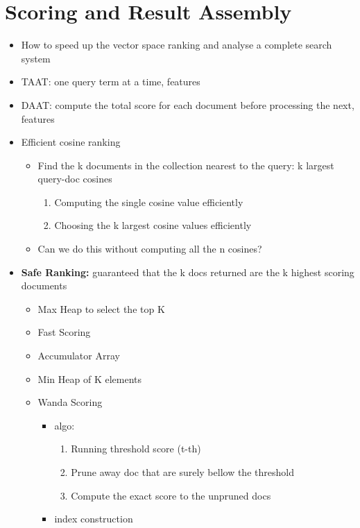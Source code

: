 \chapter{Scoring and Result Assembly}

\begin{itemize}
    \item How to speed up the vector space ranking and analyse a complete search system
    \item TAAT: one query term at a time, features
    \item DAAT: compute the total score for each document before processing the next, features
    \item Efficient cosine ranking
    \begin{itemize}
        \item Find the k documents in the collection nearest to the query: k largest query-doc cosines
        \begin{enumerate}
            \item Computing the single cosine value efficiently
            \item Choosing the k largest cosine values efficiently
        \end{enumerate}
        \item Can we do this without computing all the n cosines?
    \end{itemize}
    \item \textbf{Safe Ranking:} guaranteed that the k docs returned are the k highest scoring documents
    \begin{itemize}
        \item Max Heap to select the top K
        \item Fast Scoring
        \item Accumulator Array
        \item Min Heap of K elements
        \item Wanda Scoring
        \begin{itemize}
            \item algo:
            \begin{enumerate}
                \item Running threshold score (t-th)
                \item Prune away doc that are surely bellow the threshold
                \item Compute the exact score to the unpruned docs
            \end{enumerate}
            \item index construction

\end{itemize}
\end{itemize}
\end{itemize}
